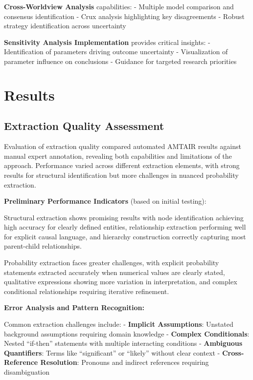 \documentclass[
  11pt,
  letterpaper,
]{book}
\begin{document}
\textbf{Cross-Worldview Analysis} capabilities: - Multiple model
comparison and consensus identification - Crux analysis highlighting key
disagreements - Robust strategy identification across uncertainty

\textbf{Sensitivity Analysis Implementation} provides critical insights:
- Identification of parameters driving outcome uncertainty -
Visualization of parameter influence on conclusions - Guidance for
targeted research priorities

\section{Results}\label{sec-results}

\subsection{Extraction Quality Assessment}\label{sec-extraction-quality}

Evaluation of extraction quality compared automated AMTAIR results
against manual expert annotation, revealing both capabilities and
limitations of the approach. Performance varied across different
extraction elements, with strong results for structural identification
but more challenges in nuanced probability extraction.

\textbf{Preliminary Performance Indicators} (based on initial testing):

Structural extraction shows promising results with node identification
achieving high accuracy for clearly defined entities, relationship
extraction performing well for explicit causal language, and hierarchy
construction correctly capturing most parent-child relationships.

Probability extraction faces greater challenges, with explicit
probability statements extracted accurately when numerical values are
clearly stated, qualitative expressions showing more variation in
interpretation, and complex conditional relationships requiring
iterative refinement.

\textbf{Error Analysis and Pattern Recognition:}

Common extraction challenges include: - \textbf{Implicit Assumptions}:
Unstated background assumptions requiring domain knowledge -
\textbf{Complex Conditionals}: Nested ``if-then'' statements with
multiple interacting conditions - \textbf{Ambiguous Quantifiers}: Terms
like ``significant'' or ``likely'' without clear context -
\textbf{Cross-Reference Resolution}: Pronouns and indirect references
requiring disambiguation
\end{document}
